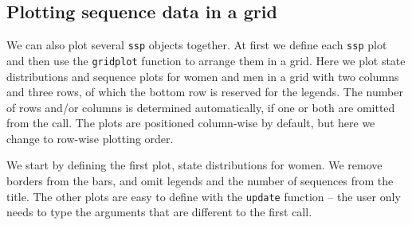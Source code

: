 \documentclass[12pt]{article}\usepackage[]{graphicx}\usepackage[]{color}
\begin{document}
\subsection{Plotting sequence data in a grid}

We can also plot several \texttt{ssp} objects together. At first we define each \texttt{ssp} plot and then use the \texttt{gridplot} function to arrange them in a grid. Here we plot state distributions and sequence plots for women and men in a grid with two columns and three rows, of which the bottom row is reserved for the legends. The number of rows and/or columns is determined automatically, if one or both are omitted from the call. The plots are positioned column-wise by default, but here we change to row-wise plotting order.

We start by defining the first plot, state distributions for women. We remove borders from the bars, and omit legends and the number of sequences from the title. The other plots are easy to define with the \texttt{update} function -- the user only needs to type the arguments that are different to the first call.
\end{document}
